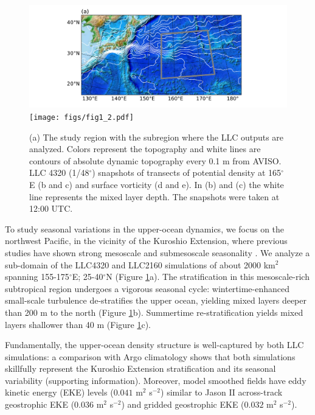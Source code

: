 \documentclass[grl]{agutex2015}
\begin{document}
\begin{article}
\begin{figure}[ht]
\begin{center}
\hspace{-1.25cm}\includegraphics[width=.7\textwidth]{figs/fig1_1.pdf}\\
\vspace{-.125cm}
\texttt{[image: figs/fig1\_2.pdf]}
 \caption{\small (a) The study region with the subregion where the LLC outputs are
          analyzed. Colors represent the topography and white lines are contours of absolute
          dynamic topography every 0.1 m from AVISO. LLC 4320 (1/48$^\circ$) snapshots of
          transects
          of potential density at 165$^\circ$E (b and c) and  surface vorticity (d and e).
          In (b) and (c) the white line represents the mixed layer depth. The snapshots were
          taken at 12:00 UTC.}
\vspace{-1.5cm}
 \label{fig1}
 \end{center}
 \end{figure}


To study seasonal variations in the upper-ocean dynamics, we focus on the northwest
Pacific, in the vicinity of the Kuroshio
Extension, where previous studies have shown strong mesoscale and submesoscale seasonality
\citep{sasaki_etal2014,qiu_etal2014}.
We analyze a sub-domain of the LLC4320 and LLC2160 simulations of about 2000 km$^2$
spanning 155-175$^\circ$E; 25-40$^\circ$N (Figure \ref{fig1}a). The stratification
in this mesoscale-rich subtropical region undergoes a vigorous seasonal cycle: wintertime-enhanced
small-scale turbulence de-stratifies the upper ocean, yielding mixed layers
deeper than 200 m to the north (Figure \ref{fig1}b). Summertime re-stratification yields mixed layers shallower
than 40 m (Figure \ref{fig1}c).

Fundamentally, the upper-ocean density structure is well-captured by both LLC simulations:
a comparison with Argo climatology shows that both simulations skillfully represent the Kuroshio
Extension stratification and its seasonal variability  (supporting information). Moreover, model smoothed
fields have eddy kinetic energy (EKE) levels ($0.041$ m$^2$ s$^{-2}$) similar to Jason II across-track
geostrophic EKE ($0.036$ m$^2$ s$^{-2}$) and gridded geostrophic EKE ($0.032$ m$^2$ s$^{-2}$).




\end{article}
\end{document}
